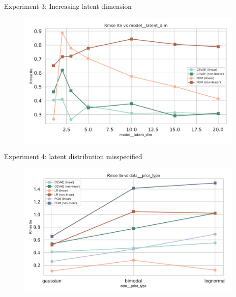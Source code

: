 \documentclass[10pt]{beamer}
\begin{document}
\begin{frame}{Experiment 3: Increasing latent dimension}
    \begin{figure}[H]
      \includegraphics[width=\textwidth]{images/MyRun_model__latent_dim--rmse_ite.pdf}
    \end{figure}
\end{frame}

\begin{frame}{Experiment 4: latent distribution misspecified}
    \begin{figure}[H]
      \includegraphics[width=\textwidth]{images/MyRun_data__prior_type--rmse_ite.pdf}
    \end{figure}
\end{frame}
\end{document}

